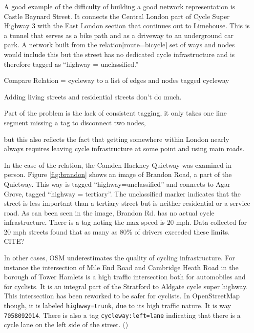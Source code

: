 A good example of the difficulty of building a good network representation is Castle Baynard Street. It connects the Central London part of Cycle Super Highway 3 with the East London section that continues out to Limehouse. This is a tunnel that serves as a bike path and as a driveway to an underground car park. A network built from the relation[route=bicycle] set of ways and nodes would include this but the street has no dedicated cycle infrastructure and is therefore tagged as ``highway = unclassified.'' 




Compare Relation = cycleway to a list of edges and nodes tagged cycleway

Adding living streets and residential streets don't do much. 

Part of the problem is the lack of consistent tagging, it only takes one line segment missing a tag to disconnect two nodes,

but this also reflects the fact that getting somewhere within London nearly always requires leaving cycle infrastructure at some point and using main roads.

In the case of the relation, the Camden Hackney Quietway was examined in person. Figure \ref{fig:brandon} shows an image of Brandon Road, a part of the Quietway. This way is tagged ``highway=unclassified'' and connects to Agar Grove, tagged ``highway = tertiary''. The unclassified marker indicates that the street is less important than a tertiary street but is neither residential or a service road. As can been seen in the image, Brandon Rd. has no actual cycle infrastructure. There is a tag noting the max speed is 20 mph. Data collected for 20 mph streets found that as many as 80\% of drivers exceeded these limits. CITE?

In other cases, OSM underestimates the quality of cycling infrastructure. For instance the intersection of Mile End Road and Cambridge Heath Road in the borough of Tower Hamlets is a high traffic intersection both for automobiles and for cyclists. It is an integral part of the Stratford to Aldgate cycle super highway. This intersection has been reworked to be safer for cyclists. In OpenStreetMap though, it is labeled \texttt{highway=trunk}, due to its high traffic nature. It is way \texttt{7058092014}. There is also a tag \texttt{cycleway:left=lane} indicating that there is a cycle lane on the left side of the street. (\cite{osm})


